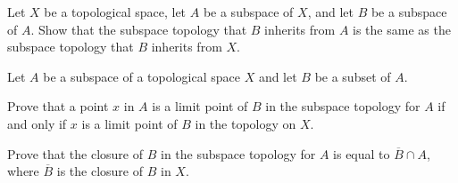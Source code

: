 \item Let $X$ be a topological space, let $A$ be a subspace of $X$, and let $B$ be a subspace of $A$. Show that the subspace topology that $B$ inherits from $A$ is the same as the subspace topology that $B$ inherits from $X$.

\begin{comment}

\ExerciseSolution Let $O$ be an open set in $B$ considered as a subspace of $A$. Then $O = B \cap O_A$ for some set $O_A$ that is open in $A$. Since $O_A$ is open in $A$, there exists an open set $O_X$ in $X$ such that $O_A = A \cap O_X$. But then $O = B \cap O_A = B \cap (A \cap O_X) = B \cap O_X$. So every open set in $B$ as a subspace of $A$ has the form $B \cap O_X$ for some open set $O_X$ in $X$. 

Similarly, if $O_X$ is an open set in $X$, then $A \cap O_X$ is an open set in the subspace $A$. From this it follows that $B \cap (A \cap O_X) = B \cap O_X$ is an open set in $B$ considered as a subspace of $A$. So the subspace topology that $B$ inherits from $A$ is the same as the subspace topology that $B$ inherits from $X$.


\end{comment}

\item Let $A$ be a subspace of a topological space $X$ and let $B$ be a subset of $A$.

\ba

\item Prove that a point $x$ in $A$ is a limit point of $B$ in the subspace topology for $A$ if and only if $x$ is a limit point of $B$ in the topology on $X$.

\item Prove that the closure of $B$ in the subspace topology for $A$ is equal to $\overline{B} \cap A$, where $\overline{B}$ is the closure of $B$ in $X$.

\ea

